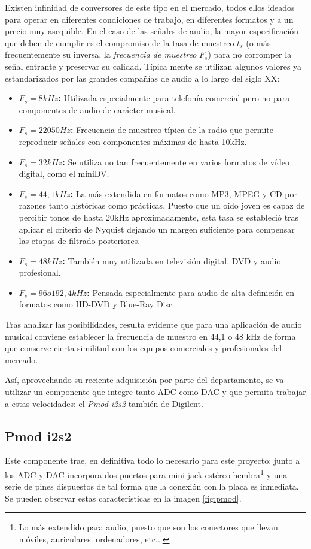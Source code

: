 Existen infinidad de conversores de este tipo en el mercado, todos ellos ideados para operar en diferentes condiciones de trabajo, en diferentes formatos y a un precio muy asequible. En el caso de las señales de audio, la mayor especificación que deben de cumplir es el compromiso de la tasa de muestreo $t_{s}$ (o más frecuentemente su inversa, la \emph{frecuencia de muestreo} $F_{s}$) para no corromper la señal entrante y preservar su calidad. Típica mente se utilizan algunos valores ya estandarizados por las grandes compañías de audio a lo largo del siglo XX:

\begin{itemize}
\item \textbf{$F_{s} = 8kHz$:} Utilizada especialmente para telefonía comercial pero no para componentes de audio de carácter musical.
\item \textbf{$F_{s} = 22050Hz$:} Frecuencia de muestreo típica de la radio que permite reproducir señales con componentes máximas de hasta 10kHz.
\item \textbf{$F_{s} = 32kHz$:} Se utiliza no tan frecuentemente en varios formatos de vídeo digital, como el miniDV.
\item \textbf{$F_{s} = 44,1kHz$:} La más extendida en formatos como MP3, MPEG y CD por razones tanto históricas como prácticas. Puesto que un oído joven es capaz de percibir tonos de hasta 20kHz aproximadamente, esta tasa se estableció tras aplicar el criterio de Nyquist dejando un margen suficiente para compensar las etapas de filtrado posteriores.
\item \textbf{$F_{s} = 48kHz$:} También muy utilizada en televisión digital, DVD y audio profesional.
\item \textbf{$F_{s} = 96 o 192,4kHz$:} Pensada especialmente para audio de alta definición en formatos como HD-DVD y Blue-Ray Disc
\end{itemize}

Tras analizar las posibilidades, resulta evidente que para una aplicación de audio musical conviene establecer la frecuencia de muestro en 44,1 o 48 kHz de forma que conserve cierta similitud con los equipos comerciales y profesionales del mercado.

Así, aprovechando su reciente adquisición por parte del departamento, se va utilizar un componente que integre tanto ADC como DAC y que permita trabajar a estas velocidades: el \emph{Pmod i2s2} también de Digilent.

\subsection{Pmod i2s2}
Este componente trae, en definitiva todo lo necesario para este proyecto: junto a los ADC y DAC incorpora dos puertos para mini-jack estéreo hembra\footnote{Lo más extendido para audio, puesto que son los conectores que llevan móviles, auriculares. ordenadores, etc...} y una serie de pines dispuestos de tal forma que la conexión con la placa es inmediata. Se pueden observar estas características en la imagen \ref{fig:pmod}.

